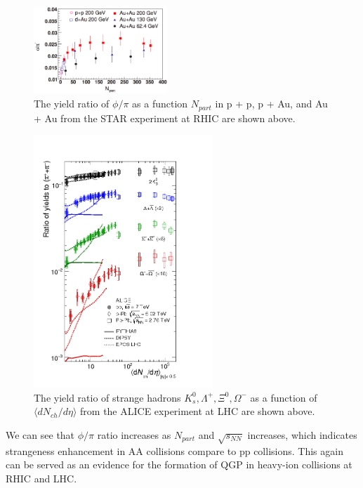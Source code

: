 \begin{figure}[hbtp]
\begin{center}
\includegraphics[width=0.45\textwidth]{Figures/Chapter1/STARPhiOverPi.png}
\caption{The yield ratio of $\phi/\pi$ as a function $N_{part}$ in p + p, p + Au, and Au + Au from the STAR experiment at RHIC are shown above.}
\label{PhiRAA1}
\end{center}
\end{figure}   

\begin{figure}[hbtp]
\begin{center}
\includegraphics[width=0.60\textwidth]{Figures/Chapter1/ALICEStrange.png}
\caption{The yield ratio of strange hadrons $K^0_s, \Lambda^+, \Xi^0, \Omega^-$ as a function of $\langle dN_{ch}/d\eta \rangle$ from the ALICE experiment at LHC are shown above.}
\label{PhiRAA2}
\end{center}
\end{figure}   

We can see that $\phi/\pi$ ratio increases as $N_{part}$ and $\sqrt {s_{NN}}$ increases, which indicates strangeness enhancement in AA collisions compare to pp collisions. This again can be served as an evidence for the formation of QGP in heavy-ion collisions at RHIC and LHC. 

